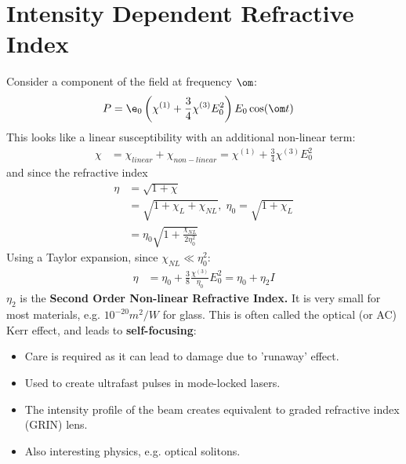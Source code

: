 \documentclass[a4paper, 11pt, normalem]{report}
\begin{document}
\section{Intensity Dependent Refractive Index}
Consider a component of the field at frequency $\om$:
\begin{align}
    P &= \e_0\left(\chi^{(1)}+\frac34\chi^{(3)}E_0^2\right)E_0\cos(\om t)
\end{align}
This looks like a linear susceptibility with an additional non-linear term:
\begin{align}
    \chi &= \chi_{linear} + \chi_{non-linear} = \chi^{(1)}+\frac34\chi^{(3)}E_0^2
\end{align}
and since the refractive index
\begin{align}
    \eta &= \sqrt{1+\chi} \\
         &= \sqrt{1+\chi_L+\chi_{NL}},\; \eta_0 = \sqrt{1+\chi_L} \\
         &= \eta_0\sqrt{1+\frac{\chi_{NL}}{2\eta_0^2}}
\end{align}
Using a Taylor expansion, since $\chi_{NL}\ll\eta_0^2$:
\begin{align}
    \eta &= \eta_0 + \frac38\frac{\chi^{(3)}}{\eta_0}E_0^2 = \eta_0 + \eta_2I
\end{align}
$\eta_2$ is the \textbf{Second Order Non-linear Refractive Index.}
It is very small for most materials, e.g. $10^{-20} m^2/W$ for glass. 
This is often called the optical (or AC) Kerr effect, and leads to \textbf{self-focusing}:
\begin{figure}[H]
    \centering
\end{figure}
\begin{itemize}
    \item Care is required as it can lead to damage due to 'runaway' effect. 
    \item Used to create ultrafast pulses in mode-locked lasers. 
    \item The intensity profile of the beam creates equivalent to graded refractive index (GRIN) lens. 
    \item Also interesting physics, e.g. optical solitons. 
\end{itemize}


\end{document}
